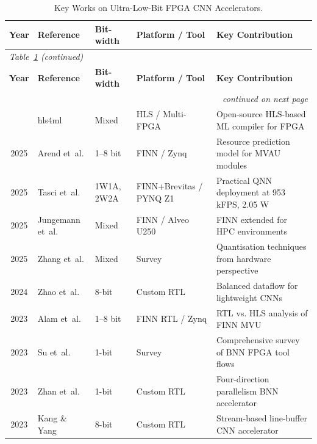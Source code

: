 \documentclass[12pt, a4paper]{report}
\numberwithin{equation}{chapter}
\numberwithin{figure}{chapter}
\numberwithin{table}{chapter}
\numberwithin{algorithm}{chapter}
\begin{document}
{\footnotesize
\renewcommand{\arraystretch}{0.95}
\begin{longtable}{@{}c l l l p{4.6cm}@{}}
\caption{Key Works on Ultra-Low-Bit FPGA CNN Accelerators.}
\label{tab:related_fpga}\\
\toprule
\textbf{Year} & \textbf{Reference} & \textbf{Bit-width} & \textbf{Platform / Tool} & \textbf{Key Contribution} \\
\midrule
\endfirsthead
\multicolumn{5}{l}{\footnotesize\emph{Table~\ref{tab:related_fpga} (continued)}}\\
\toprule
\textbf{Year} & \textbf{Reference} & \textbf{Bit-width} & \textbf{Platform / Tool} & \textbf{Key Contribution} \\
\midrule
\endhead
\midrule
\multicolumn{5}{r}{\footnotesize\emph{continued on next page}}\\
\endfoot
\bottomrule
\endlastfoot
2026 & hls4ml \cite{Schulte2025hls4ml}           & Mixed       & HLS / Multi-FPGA       & Open-source HLS-based ML compiler for FPGA \\
2025 & Arend et~al. \cite{Arend2025MVAUPredict}   & 1--8 bit    & FINN / Zynq             & Resource prediction model for MVAU modules \\
2025 & Tasci et~al. \cite{Tasci2025FPGAQNN}       & 1W1A, 2W2A  & FINN+Brevitas / PYNQ Z1 & Practical QNN deployment at 953 kFPS, 2.05 W \\
2025 & Jungemann et~al. \cite{Jungemann2025FINNHPC} & Mixed     & FINN / Alveo U250       & FINN extended for HPC environments \\
2025 & Zhang et~al. \cite{Fouda2025QuantCNNHW}    & Mixed       & Survey                  & Quantisation techniques from hardware perspective \\
2024 & Zhao et~al. \cite{Zhao2024HighThroughput}  & 8-bit       & Custom RTL              & Balanced dataflow for lightweight CNNs \\
2023 & Alam et~al. \cite{Alam2023RTLMVU}          & 1--8 bit    & FINN RTL / Zynq         & RTL vs. HLS analysis of FINN MVU \\
2023 & Su et~al. \cite{Su2023BNNFPGASurvey}       & 1-bit       & Survey                  & Comprehensive survey of BNN FPGA tool flows \\
2023 & Zhan et~al. \cite{Zhan2023BNNEdge}         & 1-bit       & Custom RTL              & Four-direction parallelism BNN accelerator \\
2023 & Kang \& Yang \cite{Kang2023AoCStream}      & 8-bit       & Custom RTL              & Stream-based line-buffer CNN accelerator \\

\end{longtable}}
\end{document}

